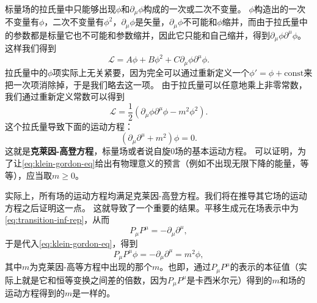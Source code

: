 \documentclass[hyperref, UTF8, a4paper]{ctexart}
\newcommand*{\const}{\mathrm{const}}
\renewcommand{\autoref}{\prettyref}
\begin{document}
标量场的拉氏量中只能够出现$\phi$和$\partial_\mu \phi$构成的一次或二次不变量。
$\phi$构造出的一次不变量有$\phi$，二次不变量有$\phi^2$，$\partial_\mu \phi$是矢量，$\partial_\mu \phi$不可能和$\phi$缩并，而由于拉氏量中的参数都是标量它也不可能和参数缩并，因此它只能和自己缩并，得到$\partial_\mu \phi \partial^\mu \phi$。
这样我们得到
\[
    \mathcal{L} = A \phi + B \phi^2 + C \partial_\mu \phi \partial^\mu \phi.
\]
拉氏量中的$\phi$项实际上无关紧要，因为完全可以通过重新定义一个$\phi' = \phi + \const$来把一次项消除掉，于是我们略去这一项。
由于拉氏量可以任意地乘上非零常数，我们通过重新定义常数可以得到
\begin{equation}
    \mathcal{L} = \frac{1}{2} (\partial_\mu \phi \partial^\mu \phi - m^2 \phi^2).
\end{equation}
这个拉氏量导致下面的运动方程：
\begin{equation}
    (\partial_\mu \partial^\mu + m^2) \phi = 0.
    \label{eq:klein-gordon-eq}
\end{equation}
这就是\textbf{克莱因-高登方程}，标量场或者说自旋0场的基本运动方程。
可以证明，为了让\eqref{eq:klein-gordon-eq}给出有物理意义的预言（例如不出现无限下降的能量，等等），应当取$m \geq 0$。

实际上，所有场的运动方程均满足克莱因-高登方程。我们将在推导其它场的运动方程之后证明这一点。
这就导致了一个重要的结果。平移生成元在场表示中为\eqref{eq:transition-inf-rep}，从而
\[
    P_\mu P^\mu = - \partial_\mu \partial^\mu,
\]
于是代入\eqref{eq:klein-gordon-eq}，得到
\[
    P_\mu P^\mu \phi = - \partial_\mu \partial^\mu = m^2 \phi,
\]
其中$m$为克莱因-高等方程中出现的那个$m$。也即，通过$P_\mu P^\mu$的表示的本征值（实际上就是它和恒等变换之间差的倍数，因为$P_\mu P^\mu$是卡西米尔元）得到的$m$和场的运动方程得到的$m$是一样的。
\end{document}
